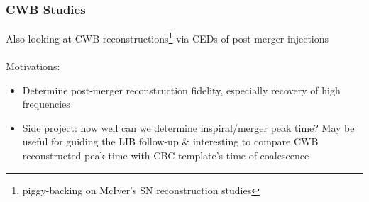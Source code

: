 \documentclass{beamer}
\begin{document}
\begin{frame}
    \frametitle{CWB Studies}
    Also looking at CWB reconstructions\footnote{piggy-backing on McIver's SN
    reconstruction studies} via CEDs of post-merger injections\\~\\
    Motivations:
    \begin{itemize}
        \item Determine post-merger reconstruction fidelity, especially recovery
            of high frequencies
        \item Side project: how well can we determine inspiral/merger peak time?
            May be useful for guiding the LIB follow-up \& interesting to
            compare CWB reconstructed peak time with CBC template's
            time-of-coalescence
    \end{itemize}
\end{frame}
\end{document}
